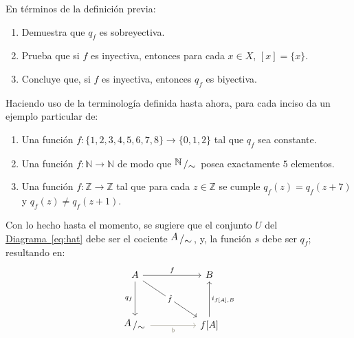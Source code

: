 \documentclass[letterpaper,DIV=14,headsepline,12pt]{scrartcl}
\newcommand{\pts}{}
\newenvironment{ejercicio}[1]{\ifthenelse{\equal{#1}{1} \OR
\equal{#1}{+1}}{\renewcommand{\pts}{\textbf{(#1
pt)}}}{\renewcommand{\pts}{\textbf{(#1 pts)}}}\begin{ejj}\upshape
\pts}{\end{ejj}}
\newcommand{\quot}[2]{{\raisebox{.2em}{$#1$}\left/\raisebox{-.2em}{$#2$}\right.}}
\begin{document}
    \begin{ejercicio}{1.5}
        En términos de la definición previa:
        \begin{enumerate}
            \item Demuestra que $q_f$ es sobreyectiva.
            \item Prueba que si $f$ es inyectiva, entonces para cada $x \in X$,
            $[x]=\{x\}$.
            \item Concluye que, si $f$ es inyectiva, entonces $q_f$ es
            biyectiva.
        \end{enumerate}
    \end{ejercicio}

    \begin{ejercicio}{1.5}
        Haciendo uso de la terminología definida hasta ahora, para cada inciso
        da un ejemplo particular de:
        \begin{enumerate}
            \item Una función $f\colon \{1,2,3,4,5,6,7,8\} \to \{0,1,2\}$ tal que
            $q_f$ sea constante.
            \item Una función $f\colon \mathbb{N} \to \mathbb{N}$ de modo que
            $\quot{\mathbb{N}}{\sim}$ posea exactamente $5$ elementos.
            \item Una función $f\colon \mathbb{Z} \to \mathbb{Z}$ tal que para cada $z
            \in \mathbb{Z}$ se cumple $q_f(z) = q_f(z+7)$ y $q_f(z) \neq q_f(z+1)$.
        \end{enumerate}
    \end{ejercicio}

    Con lo hecho hasta el momento, se sugiere que el conjunto $U$ del
    \hyperref[eq:hat]{Diagrama~\ref*{eq:hat}} debe ser el cociente
    $\quot{A}{\sim}$, y, la función $s$ debe ser $q_f$; resultando en:
    \begin{equation}\label{eq:casi}
        \begin{tikzcd}
            A && B \\
            \\
            \quot{A}{\sim} && {f[A]}
            \arrow["f", from=1-1, to=1-3]
            \arrow["q_f"', from=1-1, to=3-1]
            \arrow["{\hat{f}}"{description}, from=1-1, to=3-3]
            \arrow["b"', from=3-1, to=3-3, draw=Cornsilk4, text=Cornsilk4]
            \arrow["{i_{f[A],B}}"', from=3-3, to=1-3]
        \end{tikzcd}
    \end{equation}
\end{document}
